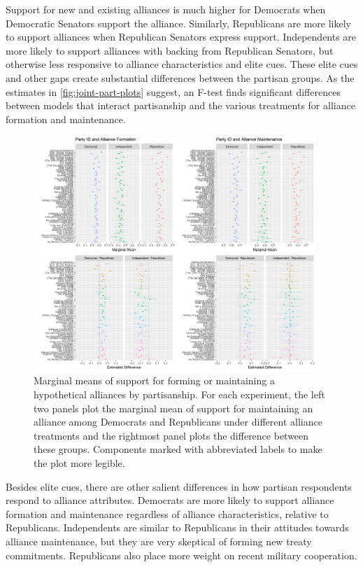 \documentclass[12pt]{article}
\begin{document}
Support for new and existing alliances is much higher for Democrats when Democratic Senators support the alliance.
Similarly, Republicans are more likely to support alliances when Republican Senators express support.
Independents are more likely to support alliances with backing from Republican Senators, but otherwise less responsive to alliance characteristics and elite cues. 
These elite cues and other gaps create substantial differences between the partisan groups. 
As the estimates in \autoref{fig:joint-part-plots} suggest, an F-test finds significant differences between models that interact partisanship and the various treatments for alliance formation and maintenance. 


\begin{figure}
	\centering
		\includegraphics[width=0.95\textwidth]{../figures/joint-part-plots.png}
	\caption{Marginal means of support for forming or maintaining a hypothetical alliances by partisanship. For each experiment, the left two panels plot the marginal mean of support for maintaining an alliance among Democrats and Republicans under different alliance treatments and the rightmost panel plots the difference between these groups. Components marked with abbreviated labels to make the plot more legible.}
	\label{fig:joint-part-plots}
\end{figure}


Besides elite cues, there are other salient differences in how partisan respondents respond to alliance attributes.
Democrats are more likely to support alliance formation and maintenance regardless of alliance characteristics, relative to Republicans. 
Independents are similar to Republicans in their attitudes towards alliance maintenance, but they are very skeptical of forming new treaty commitments. 
Republicans also place more weight on recent military cooperation. 
\end{document}
